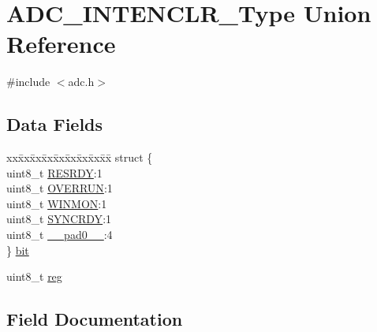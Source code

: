 \hypertarget{union_a_d_c___i_n_t_e_n_c_l_r___type}{}\section{A\+D\+C\+\_\+\+I\+N\+T\+E\+N\+C\+L\+R\+\_\+\+Type Union Reference}
\label{union_a_d_c___i_n_t_e_n_c_l_r___type}


{\ttfamily \#include $<$adc.\+h$>$}

\subsection*{Data Fields}
\begin{DoxyCompactItemize}
\item 
\begin{tabbing}
xx\=xx\=xx\=xx\=xx\=xx\=xx\=xx\=xx\=\kill
struct \{\\
\>uint8\_t \mbox{\hyperlink{union_a_d_c___i_n_t_e_n_c_l_r___type_a94751e8a3ff003866aebb8f5df19020d}{RESRDY}}:1\\
\>uint8\_t \mbox{\hyperlink{union_a_d_c___i_n_t_e_n_c_l_r___type_aaf049b0384a8e01c622391ab80c604d2}{OVERRUN}}:1\\
\>uint8\_t \mbox{\hyperlink{union_a_d_c___i_n_t_e_n_c_l_r___type_a5d973ab351fe45e44b765a6621d031ef}{WINMON}}:1\\
\>uint8\_t \mbox{\hyperlink{union_a_d_c___i_n_t_e_n_c_l_r___type_aece75e176e4fd55bf68937f1b56bde63}{SYNCRDY}}:1\\
\>uint8\_t \mbox{\hyperlink{union_a_d_c___i_n_t_e_n_c_l_r___type_a8b4eebe79ded0459acec2f4950102ba3}{\_\_pad0\_\_}}:4\\
\} \mbox{\hyperlink{union_a_d_c___i_n_t_e_n_c_l_r___type_a34425805fca6e0a2e38c1c12e597942a}{bit}}\\

\end{tabbing}\item 
uint8\+\_\+t \mbox{\hyperlink{union_a_d_c___i_n_t_e_n_c_l_r___type_a9428adc9af4653a2050e2536b55dec8d}{reg}}
\end{DoxyCompactItemize}


\subsection{Field Documentation}
\mbox{\label{union_a_d_c___i_n_t_e_n_c_l_r___type_a8b4eebe79ded0459acec2f4950102ba3}} 
